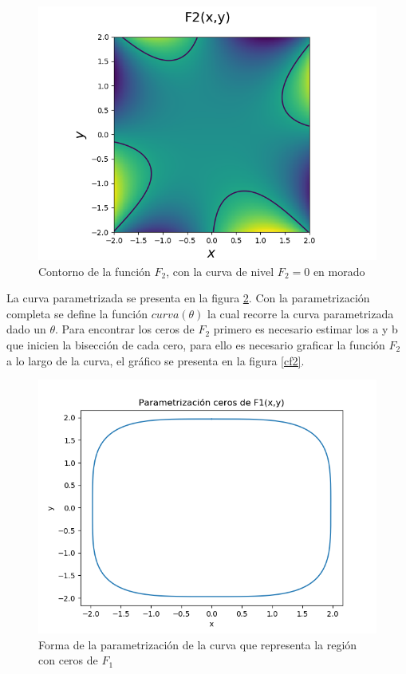 \documentclass[a4paper, 11pt, spanish]{article}
\begin{document}
\begin{figure}[h]
\centering
\includegraphics[scale=0.5]{contornoF2.png}
\caption{Contorno de la función $F_2$, con la curva de nivel $F_2 = 0$ en morado} 
\label{F2}
\end{figure} 

La curva parametrizada se presenta en la figura \ref{curva}. Con la parametrización completa se define la función $curva(\theta)$  la cual recorre la curva parametrizada dado un $\theta$. Para encontrar los ceros de $F_2$ primero es necesario estimar los a y b que inicien la bisección de cada cero, para ello es necesario graficar la función $F_2$ a lo largo de la curva, el gráfico se presenta en la figura \ref{cf2}.\\

\begin{figure}[h]
\centering
\includegraphics[scale=0.5]{parametrizacion.png}
\caption{Forma de la parametrización de la curva que representa la región con ceros de $F_1$} 
\label{curva}
\end{figure} 
\end{document}
